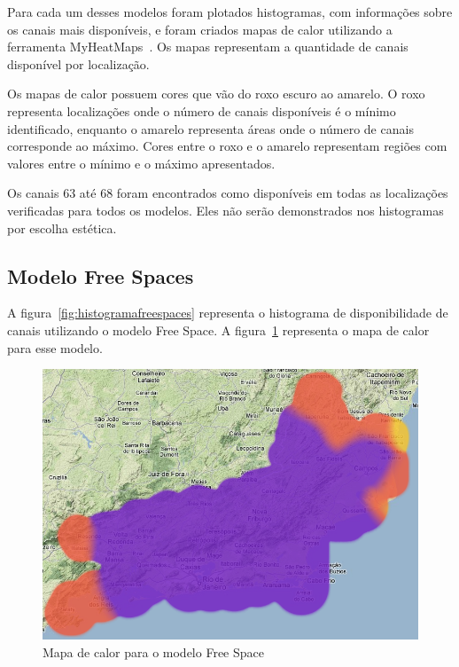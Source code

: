 Para cada um desses modelos foram plotados histogramas, com informações sobre os canais mais disponíveis, e foram criados mapas de calor utilizando a ferramenta MyHeatMaps~\cite{heatmaps}. Os mapas representam a quantidade de canais disponível por localização. 

Os mapas de calor possuem cores que vão do roxo escuro ao amarelo. O roxo representa localizações onde o número de canais disponíveis é o mínimo identificado, enquanto o amarelo representa áreas onde o número de canais corresponde ao máximo. Cores entre o roxo e o amarelo representam regiões com valores entre o mínimo e o máximo apresentados.

Os canais 63 até 68 foram encontrados como disponíveis em todas as localizações verificadas para todos os modelos. Eles não serão demonstrados nos histogramas por escolha estética.

\subsection{Modelo Free Spaces}

A figura~\ref{fig:histogramafreespaces} representa o histograma de disponibilidade de canais utilizando o modelo Free Space. A figura~\ref{fig:freespacesheatmap} representa o mapa de calor para esse modelo.

\begin{figure}[htb]
\centering
\includegraphics[width=1.0\textwidth]{figs/freespacesheatmap}
\caption[Mapa de calor para o modelo Free Space]
{Mapa de calor para o modelo Free Space}
\label{fig:freespacesheatmap}
\end{figure} 

